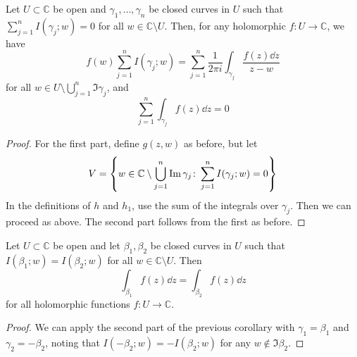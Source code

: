 \begin{corollary}
	Let \( U \subset \mathbb C \) be open and \( \gamma_1, \dots, \gamma_n \) be closed curves in \( U \) such that \( \sum_{j=1}^n I(\gamma_j;w) = 0 \) for all \( w \in \mathbb C \setminus U \).
	Then, for any holomorphic \( f \colon U \to \mathbb C \), we have
	\[ f(w) \sum_{j=1}^n I(\gamma_j;w) = \sum_{j=1}^n \frac{1}{2\pi i} \int_{\gamma_j} \frac{f(z) \dd{z}}{z-w} \]
	for all \( w \in U \setminus \bigcup_{j=1}^n \Im \gamma_j \), and
	\[ \sum_{j=1}^n \int_{\gamma_j} f(z) \dd{z} = 0 \]
\end{corollary}
\begin{proof}
	For the first part, define \( g(z,w) \) as before, but let
	\[ V = \qty{w \in \mathbb C \setminus \bigcup_{j=1}^n \Im \gamma_j \colon \sum_{j=1}^n I(\gamma_j;w) = 0} \]
	In the definitions of \( h \) and \( h_1 \), use the sum of the integrals over \( \gamma_j \).
	Then we can proceed as above.
	The second part follows from the first as before.
\end{proof}
\begin{corollary}
	Let \( U \subset \mathbb C \) be open and let \( \beta_1, \beta_2 \) be closed curves in \( U \) such that \( I(\beta_1;w) = I(\beta_2;w) \) for all \( w \in \mathbb C \setminus U \).
	Then
	\[ \int_{\beta_1} f(z) \dd{z} = \int_{\beta_2} f(z) \dd{z} \]
	for all holomorphic functions \( f \colon U \to \mathbb C \).
\end{corollary}
\begin{proof}
	We can apply the second part of the previous corollary with \( \gamma_1 = \beta_1 \) and \( \gamma_2 = -\beta_2 \), noting that \( I(-\beta_2;w) = -I(\beta_2;w) \) for any \( w \not\in \Im \beta_2 \).
\end{proof}

